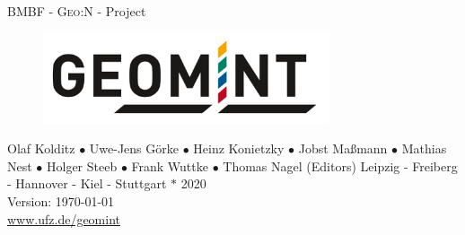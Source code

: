 
\begin{center}

\quad
\vspace{2cm}
\quad

\Huge
BMBF - \textsc{Geo:N} - Project
\\[3cm]
\begin{figure}[htbp]
\centering
\includegraphics[width=0.75\textwidth]{figures/geomint-logo}
\end{figure}
\vspace{2cm}
\Large
Olaf Kolditz $\bullet$ Uwe-Jens G\"orke $\bullet$ Heinz Konietzky $\bullet$ Jobst Ma{\ss}mann $\bullet$ Mathias Nest $\bullet$ Holger Steeb $\bullet$ Frank Wuttke $\bullet$ Thomas Nagel (Editors)
\vfill
\Large
Leipzig - Freiberg - Hannover - Kiel - Stuttgart $\ast$ 2020
\\[1ex]
Version: \today
\\[1ex]
\url{www.ufz.de/geomint}
\end{center}
\normalsize
